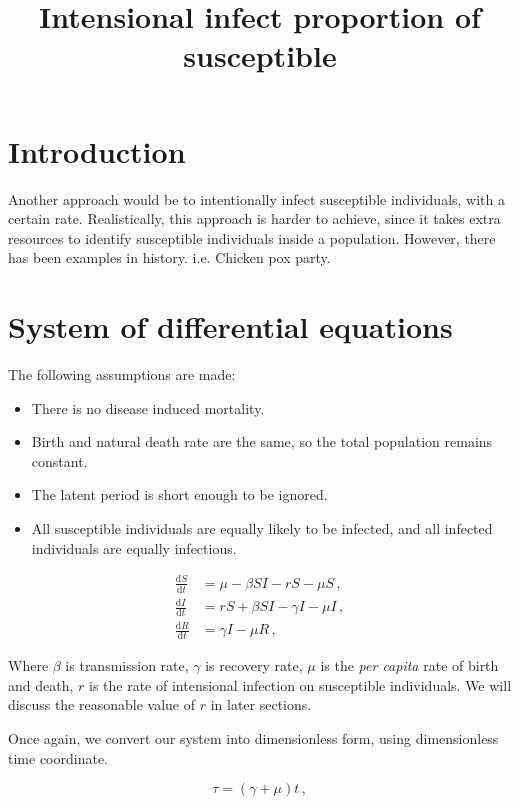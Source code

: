\documentclass[12pt]{article}
\title{Intensional infect proportion of susceptible}
\newcommand\dbyd[2]{\frac{\mathrm d{#1}}{\mathrm d{#2}}}
\begin{document}
\linenumbers
\maketitle
\section{Introduction}
Another approach would be to intentionally infect susceptible individuals, with a certain rate. Realistically, this approach is harder to achieve, since it takes extra resources to identify susceptible individuals inside a population. However, there has been examples in history. i.e. Chicken pox party.

\section{System of differential equations}
The following assumptions are made:
\begin{itemize}
\item There is no disease induced mortality.
\item Birth and natural death rate are the same, so the total population remains constant.
\item The latent period is short enough to be ignored.
\item All susceptible individuals are equally likely to be infected, and all infected individuals are equally infectious.
\end{itemize}

\begin{equation}\label{1}
\begin{split}
\dbyd{S}{t}&=\mu- \beta SI-rS-\mu S\,, \\
\dbyd{I}{t}&=rS+\beta SI-\gamma I -\mu I\,,\\
\dbyd{R}{t}&=\gamma I-\mu R\,,
\end{split}
\end{equation}

Where $\beta$ is transmission rate, $\gamma$ is recovery rate, $\mu$ is the \emph{per capita} rate of birth and death, $r$ is the rate of intensional infection on susceptible individuals. We will discuss the reasonable value of $r$ in later sections.

Once again, we convert our system into dimensionless form, using dimensionless time coordinate.

\begin{equation}
\tau=(\gamma+\mu)t\,,
\end{equation}
\end{document}
